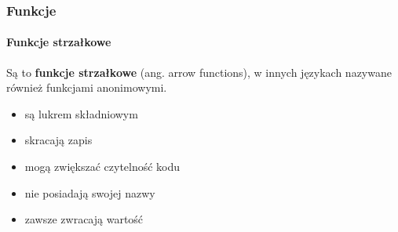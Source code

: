 \begin{frame}[fragile]
  \frametitle{Funkcje}
  \framesubtitle{Funkcje strzałkowe}

  Są to \textbf{funkcje strzałkowe} (ang. arrow functions), w innych językach nazywane również funkcjami anonimowymi.

  \begin{itemize}
    \item są lukrem składniowym
    \item skracają zapis
    \item mogą zwiększać czytelność kodu
    \item nie posiadają swojej nazwy
    \item zawsze zwracają wartość
  \end{itemize}

\end{frame}
